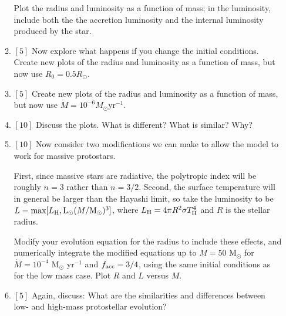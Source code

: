 \documentclass{article}
\newcommand{\msun}{\ensuremath{\mathrm{M}_\odot}\xspace}
\newcommand{\lsun}{\ensuremath{\mathrm{L}_\odot}\xspace}
\begin{document}
\begin{enumerate}
\begin{enumerate}
    Plot the radius and luminosity as
    a function of mass; in the luminosity, include both the the accretion
    luminosity and the internal luminosity produced by the star.
\item $[5]$
    Now explore what happens if you change the initial conditions.
    Create new plots of the radius and luminosity as a function of mass, but now
    use $R_0=0.5 R_\odot$. 
\item $[5]$
    Create new plots of the radius and luminosity as a function of mass, but now
    use $\dot{M}=10^{-6} M_\odot \mathrm{yr}^{-1}$. 
\item $[10]$ Discuss the plots.  What is different?  What is similar?  Why?
\item $[10]$ Now consider two modifications we can make to allow the model to work
for massive protostars.

First, since massive stars are radiative, the
polytropic index will be roughly $n=3$ rather than $n=3/2$. Second, the
surface temperature will in general be larger than the Hayashi limit, so take
the luminosity to be $L=\max[L_{\rm H}, \lsun(M/\msun)^3]$, where $L_{\rm
H}=4\pi R^2 \sigma T_{\rm H}^4$ and $R$ is the stellar radius.

Modify your
evolution equation for the radius to include these effects, and numerically
integrate the modified equations up to $M=50$ $\msun$ for $\dot{M} = 10^{-4}$
$\msun$ yr$^{-1}$ and $f_{\rm acc}=3/4$, using the same initial conditions as
for the low mass case. Plot $R$ and $L$ versus $M$.

\item $[5]$ Again, discuss: What are the similarities and differences between low-
and high-mass protostellar evolution?

\end{enumerate}



% 


\end{enumerate}
\end{document}
